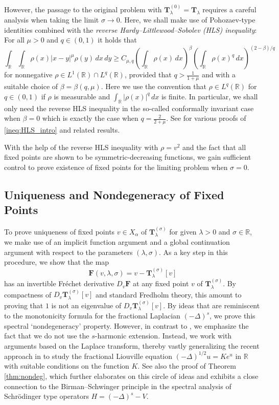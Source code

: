 \documentclass[reqno,10pt,a4paper]{amsart}
\theoremstyle{definition}
\theoremstyle{definition}
\theoremstyle{remark}
\theoremstyle{remark}
\numberwithin{equation}{section}
\newcommand{\R}{\mathbb{R}}
\newcommand{\DD}{\Delta}
\newcommand{\be}{\begin{equation}}
\newcommand{\ee}{\end{equation}}
\newcommand{\Ds}{(-\Delta)^{s}}
\newcommand{\Tss}{\mathbf{T}^{(\sigma)}_\lambda}
\newcommand{\Fs}{\mathbf{F}}
\begin{document}
However, the passage to the original problem with $\mathbf{T}^{(0)}_\lambda = \mathbf{T}_\lambda$ requires a careful analysis when taking the limit $\sigma \to 0$. Here, we shall make use of Pohozaev-type identities combined with the {\em reverse Hardy--Littlewood--Sobolev (HLS) inequality}: For all $\mu > 0$ and $q \in (0,1)$ it holds that
\be \label{ineq:HLS_intro}
\int_\R \! \int_\R \rho(x) |x-y|^{\mu} \rho(y) \,dx \,dy \geq C_{\mu, q} \left ( \int_{\R} \rho(x) \,dx \right )^\beta \left ( \int_{\R} \rho(x)^q \, dx \right )^{(2-\beta)/q} 
\ee
for nonnegative $\rho \in L^1(\R) \cap L^q(\R)$, provided that $q > \frac{1}{1+\mu}$ and with a suitable choice of $\beta=\beta(q,\mu)$. Here we use  the convention that $\rho \in L^q(\R)$ for $q \in (0,1)$ if $\rho$ is measurable and $\int_\R |\rho(x)|^q \,dx$ is finite. In particular, we shall only need the reverse HLS inequality in the so-called conformally invariant case when $\beta = 0$ which is exactly the case when $q = \frac{2}{2+\mu}$. See \cite{CaDeDoFrHo-19,Be-15,NgNg-17,DoZh-15} for various proofs of \eqref{ineq:HLS_intro} and related results.

With the help of the reverse HLS inequality with $\rho = v^2$ and the fact that all fixed points are shown to be symmetric-decreasing functions, we gain sufficient control to prove existence of fixed points for the limiting problem when $\sigma=0$.

\subsection{Uniqueness and Nondegeneracy of Fixed Points}
To prove uniqueness of fixed points $v \in X_\alpha$ of $\Tss$  for given $\lambda > 0$ and $\sigma \in \R$, we make use of an implicit function argument and a global continuation argument with respect to the parameters $(\lambda, \sigma)$. As a key step in this procedure, we show that the map 
$$
\Fs(v,\lambda, \sigma) = v-\Tss[v]
$$ 
has an invertible Fr\'echet derivative $D_v \Fs$ at any fixed point $v$ of $\Tss$. By compactness of $D_v \Tss[v]$ and standard Fredholm theory, this amount to proving that $1$ is not an eigenvalue of $D_v \Tss[v]$. By ideas that are reminiscent to the monotonicity formula for the fractional Laplacian $\Ds$, we prove this spectral `nondegeneracy' property. However, in contrast to \cite{FrLe-13,FrLeSi-16}, we emphasize the fact that we do not use the $s$-harmonic extension. Instead, we work with arguments based on the Laplace transform, thereby vastly generalizing the recent approach in \cite{AhLe-22} to study the fractional Liouville equation $(-\DD)^{1/2} u = K e^u$ in $\R$ with suitable conditions on the function $K$. See also the proof of Theorem \ref{thm:nondeg}, which further elaborates on this circle of ideas and exhibits a close connection to the Birman--Schwinger principle in the spectral analysis of Schr\"odinger type operators $H=(-\DD)^s  -V$.
\end{document}
